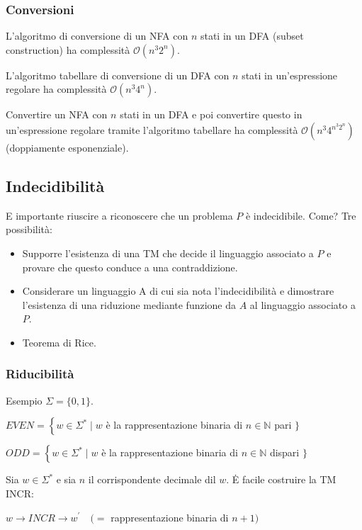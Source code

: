 \subsubsection{Conversioni}

L'algoritmo di conversione di un NFA con $n$ stati in un DFA (subset construction) ha complessità $\mathcal{O}\left(n^{3} 2^{n}\right)$.

L'algoritmo tabellare di conversione di un DFA con $n$ stati in un'espressione regolare ha complessità $\mathcal{O}\left(n^{3} 4^{n}\right)$.

Convertire un NFA con $n$ stati in un DFA e poi convertire questo in un'espressione regolare tramite l'algoritmo tabellare ha complessità $\mathcal{O}\left(n^{3} 4^{n^{3} 2^{n}}\right)$ (doppiamente esponenziale).

\subsection{Indecidibilità}

E importante riuscire a riconoscere che un problema $P$ è indecidibile.
Come? Tre possibilità:
\begin{itemize}
    \item Supporre l'esistenza di una TM che decide il linguaggio associato a $P$ e provare che questo conduce a una contraddizione.
    \item Considerare un linguaggio A di cui sia nota l'indecidibilità e dimostrare l'esistenza di una riduzione mediante funzione da $A$ al linguaggio associato a $P$.
    \item Teorema di Rice.
\end{itemize}

\subsubsection{Riducibilità}

Esempio $\Sigma=\{0,1\}$.

$E V E N=\left\{w \in \Sigma^{*} \mid w\right.$ è la rappresentazione binaria di $n \in \mathbb{N}$ pari $\}$


$O D D=\left\{w \in \Sigma^{*} \mid w\right.$ è la rappresentazione binaria di $n \in \mathbb{N}$ dispari $\}$


Sia $w \in \Sigma^{*}$ e sia $n$ il corrispondente decimale dil $w$. Ė facile costruire la TM INCR:


$w \rightarrow I N C R \rightarrow w^{\prime} \quad(=$ rappresentazione binaria di $n+1)$

